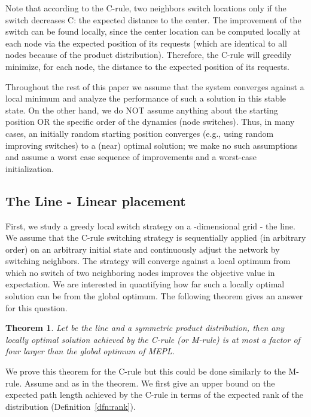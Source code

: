 \documentclass[conference]{IEEEtran}
\newtheorem{theorem}{Theorem}
\begin{document}
Note that according to the C-rule, two neighbors switch locations only if the switch decreases C: the expected distance to the center.
The improvement of the switch can be found  locally, since the center location can be computed locally at each node via the  expected position of its requests (which are identical to all nodes because of the product distribution). Therefore, the C-rule will greedily minimize, for each node, the distance to the expected position of its requests. 



Throughout the rest of this paper we assume that the system converges against a local minimum and analyze the performance of such a solution in this stable state. On the other hand, we do NOT assume anything about the starting position OR the specific order of the dynamics (node switches). Thus, in many cases, an initially random starting position converges (e.g., using random improving switches) to a (near) optimal solution; we make no such assumptions and assume a worst case sequence of improvements and a worst-case initialization.




\subsection{The Line - Linear placement}
First, we study a greedy local switch strategy on a -dimensional grid - the line.
We assume that the C-rule switching strategy is sequentially applied (in arbitrary order) on an arbitrary initial state and continuously adjust the network by switching neighbors. The strategy will converge against a local optimum from which no switch of two neighboring nodes improves the objective value in expectation.
We are interested in quantifying how far such a locally optimal solution can be from the global optimum. The following theorem gives an answer for this question.

\begin{theorem}\label{thm:approx-line}
Let  be the line and  a symmetric product distribution, then any locally optimal solution achieved by the C-rule (or M-rule) is at most a factor of four larger than the global optimum of MEPL.
\end{theorem}

We prove this theorem for the C-rule but this could be done similarly to the M-rule. Assume  and  as in the theorem.
We first give an upper bound on the expected path length achieved by the C-rule in terms of the expected rank of the distribution (Definition~\ref{dfn:rank}).
\end{document}
